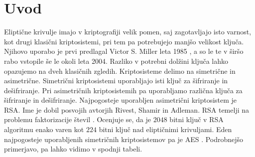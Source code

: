 \documentclass[12pt,a4paper,twoside]{article}
\theoremstyle{definition} %
\theoremstyle{plain} %
\numberwithin{equation}{section}  %
\begin{document}
\section{Uvod}
Eliptične krivulje imajo v kriptografiji velik pomen, saj zagotavljajo isto varnost, kot drugi klasični kriptosistemi, pri tem pa potrebujejo manjšo velikost ključa. Njihovo uporabo je prvi predlagal Victor S. Miller leta 1985 \cite{Miller}, a so le te v širšo rabo vstopile še le okoli leta 2004. Razliko v potrebni dolžini ključa lahko opazujemo na dveh klasičnih zgledih. Kriptosisteme delimo na simetrične in asimetrične. Simetrični kriptosistemi uporabljajo isti ključ za šifriranje in dešifriranje. Pri asimetričnih kriptosistemih pa uporabljamo različna ključa za šifriranje in dešifriranje. Najpogosteje uporabljen asimetrični kriptosistem je RSA. Ime je dobil posvojih avtorjih Rivest, Shamir in Adleman. RSA temelji na problemu faktorizacije števil \cite{Easttom2015}. Ocenjuje se, da je $2048$ bitni ključ v RSA algoritmu enako varen kot $224$ bitni ključ nad eliptičnimi krivuljami.
Eden najpogosteje uporabljenih simetričnih kriptosistemov pa je AES \cite{Easttom2015}. Podrobnejšo primerjavo, pa lahko vidimo v spodnji tabeli.
\end{document}
